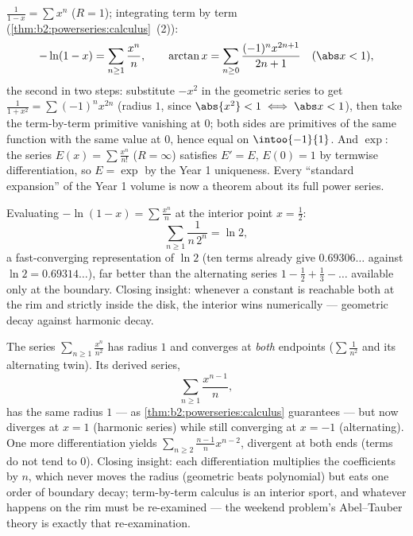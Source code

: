 \begin{example}\label{ex:b2:powerseries:classics}
$\displaystyle\frac{1}{1 - x} = \sum x^n$ ($R = 1$); integrating
term by term (\cref{thm:b2:powerseries:calculus}~(2)):
\[
-\ln(1 - x) = \sum_{n\geq1} \frac{x^n}{n},
\qquad
\arctan x = \sum_{n \geq 0} \frac{(-1)^n x^{2n+1}}{2n+1}
\quad (\abs x < 1),
\]
the second in two steps: substitute $-x^2$ in the geometric
series to get $\frac{1}{1+x^2} = \sum(-1)^nx^{2n}$ (radius
$1$, since $\abs{x^2} < 1 \iff \abs x < 1$), then take the
term-by-term primitive vanishing at $0$; both sides are
primitives of the same function with the same value at $0$,
hence equal on $\intoo{-1}{1}$. And $\exp$:
the series $E(x) = \sum \frac{x^n}{n!}$ ($R = \infty$) satisfies
$E' = E$, $E(0) = 1$ by termwise differentiation, so $E = \exp$ by
the Year 1 uniqueness. Every ``standard expansion'' of the Year 1
volume is now a theorem about its full power series.
\end{example}

\begin{example}\label{ex:b2:powerseries:lntwo}
Evaluating $-\ln(1-x) = \sum\frac{x^n}{n}$ at the interior
point $x = \frac12$:
\[
\sum_{n\geq1}\frac{1}{n\,2^n} = \ln 2 ,
\]
a fast-converging representation of $\ln 2$ (ten terms already
give $0.69306\ldots$ against $\ln 2 = 0.69314\ldots$), far
better than the alternating series $1 - \frac12 + \frac13 -
\dots$ available only at the boundary. Closing insight:
whenever a constant is reachable both at the rim and strictly
inside the disk, the interior wins numerically --- geometric
decay against harmonic decay.
\end{example}

\begin{example}\label{ex:b2:powerseries:boundaryloss}
The series $\sum_{n\geq1}\frac{x^n}{n^2}$ has radius $1$ and
converges at \emph{both} endpoints ($\sum\frac1{n^2}$ and its
alternating twin). Its derived series,
\[
\sum_{n\geq1}\frac{x^{n-1}}{n} ,
\]
has the same radius $1$ --- as
\cref{thm:b2:powerseries:calculus} guarantees --- but now
diverges at $x = 1$ (harmonic series) while still converging
at $x = -1$ (alternating). One more differentiation yields
$\sum_{n\geq2}\frac{n-1}{n}x^{n-2}$, divergent at both ends
(terms do not tend to $0$). Closing insight: each
differentiation multiplies the coefficients by $n$, which
never moves the radius (geometric beats polynomial) but eats
one order of boundary decay; term-by-term calculus is an
interior sport, and whatever happens on the rim must be
re-examined --- the weekend problem's Abel--Tauber theory is
exactly that re-examination.
\end{example}


